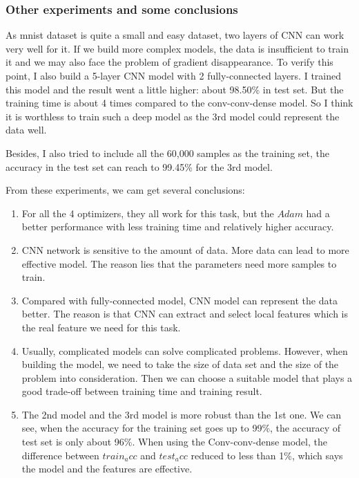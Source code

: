 \documentclass{article}
\begin{document}
\subsubsection*{Other experiments and some conclusions}

As mnist dataset is quite a small and easy dataset, two layers of CNN can work very well for it. If we build more complex models, the data is insufficient to train it and we may also face the problem of gradient disappearance. To verify this point, I also build a 5-layer CNN model with 2 fully-connected layers. I trained this model and the result went a little higher: about 98.50\% in test set. But the training time is about 4 times compared to the conv-conv-dense model. So I think it is worthless to train such a deep model as the 3rd model could represent the data well.

Besides, I also tried to include all the 60,000 samples as the training set, the accuracy in the test set can reach to 99.45\% for the 3rd model.


From these experiments, we cam get several conclusions:
\begin{enumerate}
    \item For all the 4 optimizers, they all work for this task, but the $Adam$ had a better performance with less training time and relatively higher accuracy.
    \item CNN network is sensitive to the amount of data. More data can lead to more effective model. The reason lies that the parameters need more samples to train.
    \item Compared with fully-connected model, CNN model can represent the data better. The reason is that CNN can extract and select local features which is the real feature we need for this task.
    \item Usually, complicated models can solve complicated problems. However, when building the model, we need to take the size of data set and the size of the problem into consideration. Then we can choose a suitable model that plays a good trade-off between training time and training result.
    \item The 2nd model and the 3rd model is more robust than the 1st one. We can see, when the accuracy for the training set goes up to 99\%, the accuracy of test set is only about 96\%. When using the Conv-conv-dense model, the difference between $train_acc$ and $test_acc$ reduced to less than 1\%, which says the model and the features are effective.
\end{enumerate}
\end{document}
